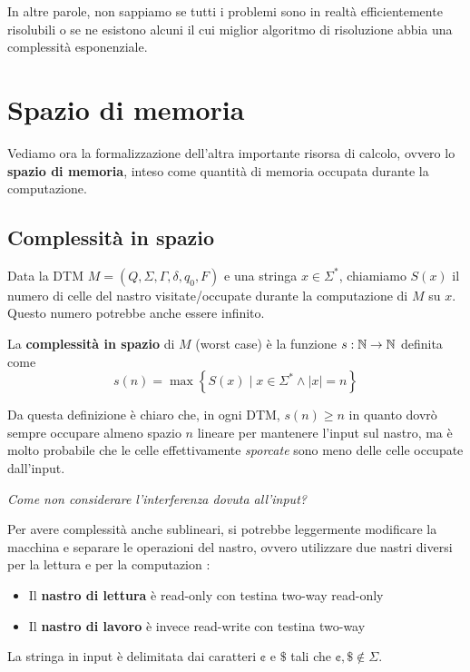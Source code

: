 In altre parole, non sappiamo se tutti i problemi sono in realtà efficientemente risolubili o se ne esistono alcuni il cui miglior algoritmo di risoluzione abbia una complessità esponenziale.

\section{Spazio di memoria}

Vediamo ora la formalizzazione dell'altra importante risorsa di calcolo, ovvero lo \textbf{spazio di memoria}, inteso come quantità di memoria occupata durante la computazione.

\subsection{Complessità in spazio}

Data la DTM $M = (Q, \Sigma, \Gamma, \delta, q_0, F)$ e una stringa $x \in \Sigma^\ast$, chiamiamo $S(x)$ il numero di celle del nastro visitate/occupate durante la computazione di $M$ su $x$. Questo numero potrebbe anche essere infinito. 

La \textbf{complessità in spazio} di $M$ (worst case) è la funzione $s: \mathbb{N} \rightarrow \mathbb{N}$ definita come
$$ s(n) = \max \left\{ S(x) \mid x \in \Sigma^\ast \wedge |x| = n \right\} $$

Da questa definizione è chiaro che, in ogni DTM, $s(n) \geq n$ in quanto dovrò sempre occupare almeno spazio $n$ lineare per mantenere l'input sul nastro, ma è molto probabile che le celle effettivamente \textit{sporcate} sono meno delle celle occupate dall'input.

\textit{Come non considerare l'interferenza dovuta all'input?}

Per avere complessità anche sublineari, si potrebbe leggermente modificare la macchina e separare le operazioni del nastro, ovvero utilizzare due nastri diversi per la lettura e per la computazion : 
\begin{itemize}
	\item Il \textbf{nastro di lettura} è read-only con testina two-way read-only
	
    \item Il \textbf{nastro di lavoro} è invece read-write con testina two-way
\end{itemize}

La stringa in input è delimitata dai caratteri $\cent$ e $\$$ tali che $\cent, \$ \notin \Sigma$. 


